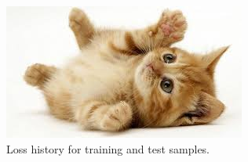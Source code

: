 \documentclass{article}
\begin{document}
    \begin{figure}
        \begin{center}
            \includegraphics{images/cat-thumb.jpeg}
        \end{center}
        \caption{Loss history for training and test samples.}
        \label{DNNtrain_electron}
    \end{figure}
\end{document}
